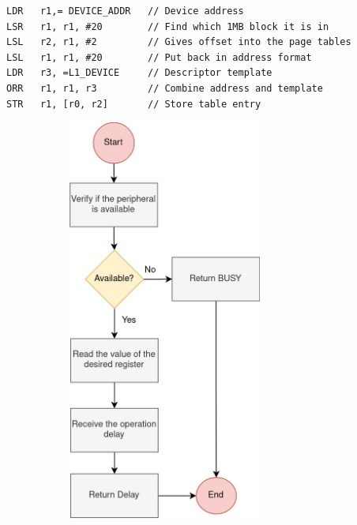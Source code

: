 \hspace{1cm}

\begin{lstlisting}[style=customasm, caption={Template for a \gls{pte}}, label=templatePTE]
LDR   r1,= DEVICE_ADDR	 // Device address
LSR   r1, r1, #20        // Find which 1MB block it is in
LSL   r2, r1, #2         // Gives offset into the page tables
LSL   r1, r1, #20        // Put back in address format
LDR   r3, =L1_DEVICE     // Descriptor template
ORR   r1, r1, r3         // Combine address and template
STR   r1, [r0, r2]       // Store table entry
\end{lstlisting}


\begin{figure}[t!]
	\centering
	\begin{subfigure}{0.4\textwidth}
		\includegraphics[width=0.7\textwidth]{Images/CrcReadFunction.png}

\end{subfigure}
\end{figure}
